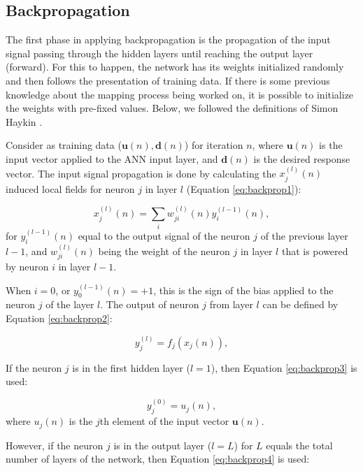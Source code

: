 \subsection{Backpropagation}
\label{ssec:Pseudocodigo}

The first phase in applying backpropagation is the propagation of the input signal passing through the hidden layers until reaching the output layer (forward). For this to happen, the network has its weights initialized randomly and then follows the presentation of training data. If there is some previous knowledge about the mapping process being worked on, it is possible to initialize the weights with pre-fixed values. Below, we followed the definitions of Simon Haykin \cite{haykin}.

Consider as training data ($\mathbf{u}(n), \mathbf{d}(n)$) for iteration $n$, where $\mathbf{u}(n)$ is the input vector applied to the ANN input layer, and $\mathbf{d} (n)$ is the desired response vector. The input signal propagation is done by calculating the $x_j^{(l)}(n)$ induced local fields for neuron $j$ in layer $l$ (Equation \ref{eq:backprop1}):

\begin{equation}
\label{eq:backprop1}
    x_j^{(l)}(n) = \sum_i w_{ji}^{(l)}(n) y_i^{(l-1)}(n),
\end{equation}
for $y_i^{(l-1)}(n)$ equal to the output signal of the neuron $j$ of the previous layer $l-1$, and $w_{ji}^{(l)}(n)$ being the weight of the neuron $j$ in layer $l$ that is powered by neuron $i$ in layer $l-1$.

When $i=0$, or $y_0^{(l-1)}(n) = +1$, this is the sign of the bias applied to the neuron $j$ of the layer $l$. The output of neuron $j$ from layer $l$ can be defined by Equation \ref{eq:backprop2}:

\begin{equation}
\label{eq:backprop2}
    y_j^{(l)} = f_j (x_j (n) ),
\end{equation}

If the neuron $j$ is in the first hidden layer ($l = 1$), then Equation \ref{eq:backprop3} is used:

\begin{equation}
    \label{eq:backprop3}
    y_j^{(0)} = u_j (n),
\end{equation}
where $u_j(n)$ is the $j$th element of the input vector $\mathbf{u}(n)$. 

However, if the neuron $j$ is in the output layer ($l = L$) for $L$ equals the total number of layers of the network, then Equation \ref{eq:backprop4} is used:

